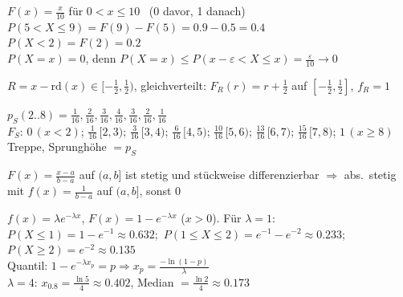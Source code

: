 \begin{bsp}[{{Tram: $X\sim$ Gleichvert.\ auf $(0,10]$ (4.0.3, 4.0.7)}}]
$F(x)=\frac{x}{10}$ für $0<x\le10$ \ (0 davor, 1 danach)\\
$P(5<X\le9)=F(9)-F(5)=0.9-0.5=0.4$\\
$P(X<2)=F(2)=0.2$\\
$P(X=x)=0$, denn $P(X=x)\le P(x-\varepsilon<X\le x)=\frac{\varepsilon}{10}\to0$
\end{bsp}
\begin{bsp}[{{Rundung (4.0.4)}}]
$R=x-\mathrm{rd}(x)\in[-\tfrac12,\tfrac12)$, gleichverteilt: $F_R(r)=r+\tfrac12$ auf $[-\tfrac12,\tfrac12]$, $f_R=1$
\end{bsp}
\begin{bsp}[{{$S$ = Summe zweier 4-seitiger Würfel (4.0.6)}}]
$p_S(2..8)=\frac1{16},\frac2{16},\frac3{16},\frac4{16},\frac3{16},\frac2{16},\frac1{16}$\\
$F_S$: $0\,(x<2)$; $\frac1{16}\,[2,3)$; $\frac3{16}\,[3,4)$; $\frac6{16}\,[4,5)$; $\frac{10}{16}\,[5,6)$; $\frac{13}{16}\,[6,7)$; $\frac{15}{16}\,[7,8)$; $1\,(x\ge8)$\\
Treppe, Sprunghöhe $=p_S$
\end{bsp}
\begin{bsp}
$F(x)=\frac{x-a}{b-a}$ auf $(a,b]$ ist stetig und stückweise differenzierbar $\Rightarrow$ abs.\ stetig mit $f(x)=\frac1{b-a}$ auf $(a,b]$, sonst 0
\end{bsp}
\begin{bsp}[{{Exponentialverteilung (4.0.10, 4.0.13)}}]
$f(x)=\lambda e^{-\lambda x}$, $F(x)=1-e^{-\lambda x}$ ($x>0$). Für $\lambda=1$:\\
$P(X\le1)=1-e^{-1}\approx0.632$;\ $P(1\le X\le2)=e^{-1}-e^{-2}\approx0.233$;\ $P(X\ge2)=e^{-2}\approx0.135$\\
Quantil: $1-e^{-\lambda x_p}=p\Rightarrow x_p=\frac{-\ln(1-p)}{\lambda}$\\
$\lambda=4$: $x_{0.8}=\frac{\ln5}4\approx0.402$, Median $=\frac{\ln2}4\approx0.173$
\end{bsp}
